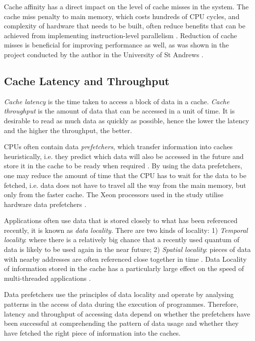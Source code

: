 Cache affinity has a direct impact on the level of cache misses in the system. The cache miss penalty to main memory, which costs hundreds of CPU cycles, and complexity of hardware that needs to be built, often reduce benefits that can be achieved from implementing instruction-level parallelism \cite{McKee2004}. Reduction of cache misses is beneficial for improving performance as well, as was shown in the project conducted by the author in the University of St Andrews \cite{Bazilinskyy2013}.

\subsection{Cache Latency and Throughput}

\textit{Cache latency} is the time taken to access a block of data in a cache. \textit{Cache throughput} is the amount of data that can be accessed in a unit of time. It is desirable to read as much data as quickly as possible, hence the lower the latency and the higher the throughput, the better.

CPUs often contain data \textit{prefetchers}, which transfer information into caches heuristically, i.e. they predict which data will also be accessed in the future and store it in the cache to be ready when required \cite{HasinaKhatoonShahidHafeezMirza2013}. By using the data prefetchers, one may reduce the amount of time that the CPU has to wait for the data to be fetched, i.e. data does not have to travel all the way from the main memory, but only from the faster cache. The Xeon processors used in the study utilise hardware data prefetchers \cite{Intel2009b}.

Applications often use data that is stored closely to what has been referenced recently, it is known as \textit{data locality}. There are two kinds of locality: 1) \textit{Temporal locality}: where there is a relatively big chance that a recently used quantum of data is likely to be used again in the near future; 2) \textit{Spatial locality}: pieces of data with nearby addresses are often referenced close together in time \cite{Denning2005}. Data Locality of information stored in the cache has a particularly large effect on the speed of multi-threaded applications \cite{ChenDing,Schneider2006}.

Data prefetchers use the principles of data locality and operate by analysing patterns in the access of data during the execution of programmes. Therefore, latency and throughput of accessing data depend on whether the prefetchers have been successful at comprehending the pattern of data usage and whether they have fetched the right piece of information into the caches. \cite[p.~811]{ward1990computation}

